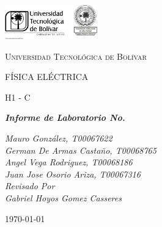 \documentclass[10pt]{article}
\begin{document}
\begin{titlepage}
	\centering
	\includegraphics[width=0.3\textwidth]{Images/logo_utb.png}\par\vspace{1cm}
	{\scshape\LARGE Universidad Tecnológica de Bolívar \par}
	\vspace{4cm}

	{\scshape\Large FÍSICA ELÉCTRICA \par}
	\vspace{.8cm}

	{\scshape\Large H1 - C \par}
	\vspace{2.5cm}
	\slshape {\Large \bfseries{}Informe de Laboratorio No.  \\}
	\vspace{2.5cm}

	\slshape {\itshape{} Mauro González, T00067622 \\}
	\slshape {\itshape{} German De Armas Castaño, T00068765 \\}
	\slshape {\itshape{} Angel Vega Rodriguez, T00068186 \\}
	\slshape {\itshape{} Juan Jose Osorio Ariza, T00067316 \\}
	\vfill
	Revisado Por \\
	Gabriel Hoyos Gomez Casseres\\
	{\large \today\par}
\end{titlepage}
\end{document}
